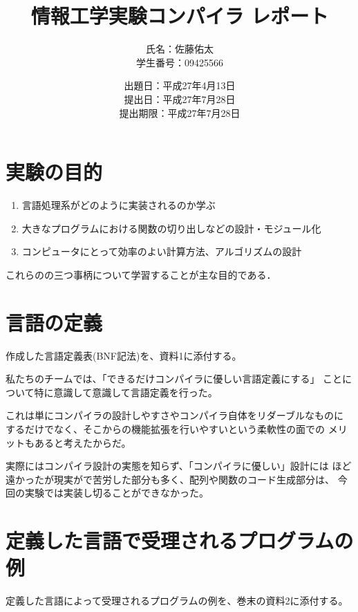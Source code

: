 \documentclass[11pt,a4j]{jarticle}
\title{情報工学実験コンパイラ レポート}
\author{氏名：佐藤佑太\\学生番号：09425566}
\date{出題日：平成27年4月13日\\提出日：平成27年7月28日\\提出期限：平成27年7月28日}
\begin{document}
\maketitle
\newpage



\section{実験の目的}

\begin{enumerate}
\item {言語処理系がどのように実装されるのか学ぶ}
\item {大きなプログラムにおける関数の切り出しなどの設計・モジュール化}
\item {コンピュータにとって効率のよい計算方法、アルゴリズムの設計}
\end{enumerate}
これらのの三つ事柄について学習することが主な目的である．




\section{言語の定義}

作成した言語定義表(BNF記法)を、資料1に添付する。

私たちのチームでは、「できるだけコンパイラに優しい言語定義にする」
ことについて特に意識して意識して言語定義を行った。

これは単にコンパイラの設計しやすさやコンパイラ自体をリダーブルなものに
するだけでなく、そこからの機能拡張を行いやすいという柔軟性の面での
メリットもあると考えたからだ。

実際にはコンパイラ設計の実態を知らず、「コンパイラに優しい」設計には
ほど遠かったが現実がで苦労した部分も多く、配列や関数のコード生成部分は、
今回の実験では実装し切ることができなかった。




\section{定義した言語で受理されるプログラムの例}


定義した言語によって受理されるプログラムの例を、巻末の資料2に添付する。
\end{document}
